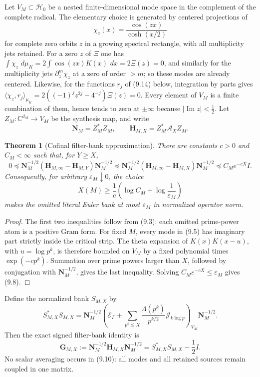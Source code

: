 \documentclass[11pt]{amsart}
\newtheorem{theorem}{Theorem}[section]
\theoremstyle{definition}
\theoremstyle{remark}
\newcommand{\dd}{\,d}
\newcommand{\XiR}{\Xi}
\begin{document}
Let \(V_M\subset\mathcal H_0\) be a nested finite-dimensional mode space
in the complement of the complete radical.  The elementary choice is
generated by centered projections of
\[
 \chi_z(x)=\frac{\cos(zx)}{\cosh(x/2)}
\tag{9.5}
\]
for complete zero orbits \(z\) in a growing spectral rectangle, with all
multiplicity jets retained.  For a zero \(z\) of \(\XiR\) one has
\(\int\chi_z\,\dd\mu_K=2\int\cos(zx)K(x)\,\dd x=2\XiR(z)=0\), and
similarly for the multiplicity jets \(\partial_z^m\chi_z\) at a zero of
order \(>m\); so these modes are already centered.  Likewise, for the
functions \(r_j\) of (9.14) below, integration by parts gives
\(\langle\chi_z,r_j\rangle_{\mu_K}=2((-1)^jz^{2j}-4^{-j})\XiR(z)=0\).
Every element of
\(V_M\) is a finite combination of them, hence tends to zero at
\(\pm\infty\) because \(\lvert\operatorname{Im}z\rvert<\frac12\).
Let \(Z_M:\mathbb C^{d_M}\to V_M\) be the
synthesis map, and write
\[
 \mathbf N_M=Z_M^*Z_M,\qquad
 \mathbf H_{M,X}=Z_M^*\mathcal A_XZ_M .
\tag{9.6}
\]

\begin{theorem}[Cofinal filter-bank approximation]
\label{thm:cofinal-filter-bank}
There are constants \(c>0\) and \(C_M<\infty\) such that, for \(Y\ge X\),
\[
 \boxed{
 0\preceq
 \mathbf N_M^{-1/2}
 (\mathbf H_{M,\infty}-\mathbf H_{M,Y})
 \mathbf N_M^{-1/2}
 \preceq
 \mathbf N_M^{-1/2}
 (\mathbf H_{M,\infty}-\mathbf H_{M,X})
 \mathbf N_M^{-1/2}
 \preceq C_Me^{-cX}I.}
\tag{9.7}
\]
Consequently, for arbitrary \(\varepsilon_M\downarrow0\), the choice
\[
 X(M)\ge\frac1c
 \left(\log C_M+\log\frac1{\varepsilon_M}\right)
\tag{9.8}
\]
makes the omitted literal Euler bank at most \(\varepsilon_M\) in
normalized operator norm.
\end{theorem}

\begin{proof}
The first two inequalities follow from (9.3): each omitted prime-power
atom is a positive Gram form.  For fixed \(M\), every mode in (9.5) has
imaginary part strictly inside the critical strip.  The theta expansion of
\(K(x)K(x-u)\), with \(u=\log p^k\), is therefore bounded on \(V_M\) by a
fixed polynomial times \(\exp(-c p^k)\).  Summation over prime powers
larger than \(X\), followed by conjugation with \(\mathbf N_M^{-1/2}\),
gives the last inequality.  Solving \(C_Me^{-cX}\le\varepsilon_M\)
gives (9.8).
\end{proof}

Define the normalized bank \(S_{M,X}\) by
\[
 S_{M,X}^*S_{M,X}
 =\mathbf N_M^{-1/2}
  \left(\mathscr E_\Gamma+
  \sum_{p^k\le X}\frac{\Lambda(p^k)}{p^{k/2}}
       \mathcal J_{k\log p}\right)_{V_M}
 \mathbf N_M^{-1/2}.
\tag{9.9}
\]
Then the exact signed filter-bank identity is
\[
 \boxed{
 \mathbf G_{M,X}:=
 \mathbf N_M^{-1/2}\mathbf H_{M,X}\mathbf N_M^{-1/2}
 =S_{M,X}^*S_{M,X}-\frac12I.}
\tag{9.10}
\]
No scalar averaging occurs in (9.10): all modes and all retained sources
remain coupled in one matrix.
\end{document}
